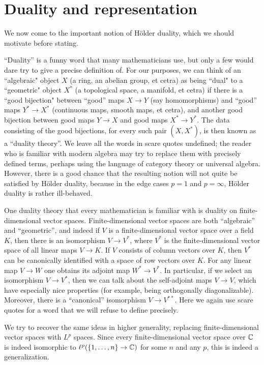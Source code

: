 \section{Duality and representation}
We now come to the important notion of H\"older duality, which we should motivate before stating.

``Duality'' is a funny word that many mathematicians use, but only a few would dare try to give a precise definition of.
For our purposes, we can think of an ``algebraic" object $X$ (a ring, an abelian group, et cetra) as being ``dual" to a ``geometric" object $X^*$ (a topological space, a manifold, et cetra) if there is a ``good bijection" between ``good'' maps $X \to Y$ (say homomorphisms) and ``good'' maps $Y^* \to X^*$ (continuous maps, smooth maps, et cetra), and another good bijection between good maps $Y \to X$ and good maps $X^* \to Y^*$.
The data consisting of the good bijections, for every such pair $(X, X^*)$, is then known as a ``duality theory''.
We leave all the words in scare quotes undefined; the reader who is familiar with modern algebra may try to replace them with precisely defined terms, perhaps using the language of category theory or universal algebra.
However, there is a good chance that the resulting notion will not quite be satisfied by H\"older duality, because in the edge cases $p = 1$ and $p = \infty$, H\"older duality is rather ill-behaved.

One duality theory that every mathematician is familiar with is duality on finite-dimensional vector spaces.
Finite-dimensional vector spaces are both ``algebraic'' and ``geometric'', and indeed if $V$ is a finite-dimensional vector space over a field $K$, then there is an isomorphism $V \to V^*$, where $V^*$ is the finite-dimensional vector space of all linear maps $V \to K$.
If $V$ consists of column vectors over $K$, then $V^*$ can be canonically identified with a space of row vectors over $K$.
For any linear map $V \to W$ one obtains its adjoint map $W^* \to V^*$.
In particular, if we select an isomorphism $V \to V^*$, then we can talk about the self-adjoint maps $V \to V$, which have especially nice properties (for example, being orthogonally diagonalizable).
Moreover, there is a ``canonical'' isomorphism $V \to V^{**}$.
Here we again use scare quotes for a word that we will refuse to define precisely.

We try to recover the same ideas in higher generality, replacing finite-dimensional vector spaces with $L^p$ spaces.
Since every finite-dimensional vector space over $\mathbb{C}$ is indeed isomorphic to $\ell^p(\{1, \dots, n\} \to \mathbb{C})$ for some $n$ and any $p$, this is indeed a generalization.

